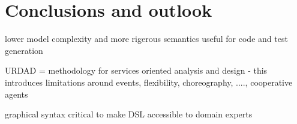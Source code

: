 \section{Conclusions and outlook \label{sec:conclusionsAndOutlook}}

lower model complexity and more rigerous semantics useful for code and test generation

URDAD = methodology for services oriented analysis and design - this introduces limitations around events, flexibility, choreography, ...., cooperative agents

graphical syntax critical to make DSL accessible to domain experts

